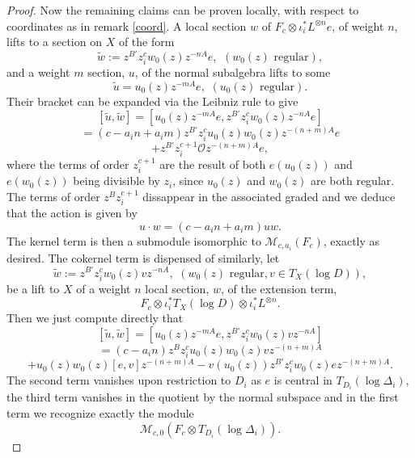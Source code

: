 \documentclass[10pt,a4paper]{amsart}
\newcommand{\OO}{\mathcal{O}}
\begin{document}
\begin{proof}
Now the remaining claims can be proven locally, with respect to coordinates as in remark \ref{coord}. A local section $w$ of $F_c\otimes\iota_i^*L^{\otimes n}e$, of weight $n$, lifts to a section on $X$ of the form $$\widetilde{w}:=z^{B'}z_i^{c}w_0(z) z^{-nA}e,\,\ (w_0(z)\,\,\mathrm{regular}),$$ and a weight $m$ section, $u$, of the normal subalgebra lifts to some $$\widetilde{u}=u_0(z) z^{-mA}e,\,\, (u_0(z)\,\,\mathrm{regular}).$$ Their bracket can be expanded via the Leibniz rule to give $$[\widetilde{u},\widetilde{w}]=[u_0(z)z^{-mA}e,z^{B'}z_i^cw_0(z)z^{-nA}e]$$ $$=(c-a_in+a_im)z^{B'}z_i^cu_0(z)w_0(z)z^{-(n+m)A}e$$ $$+z^{B'}z_i^{c+1}\OO z^{-(n+m)A}e,$$ where the terms of order $z_i^{c+1}$ are the result of both $e(u_0(z))$ and $e(w_0(z))$ being divisible by $z_i$, since $u_0(z)$ and $w_0(z)$ are both regular. The terms of order $z^Bz_i^{c+1}$ dissappear in the associated graded and we deduce that the action is given by $$u\cdot w=(c-a_in+a_im)uw.$$ The kernel term is then a submodule isomorphic to $\mathcal{M}_{c,a_i}(F_c)$, exactly as desired. The cokernel term is dispensed of similarly, let $$\widetilde{w}:=z^{B'}z_i^cw_0(z)vz^{-nA},\,\, (w_0(z)\,\,\mathrm{regular},v\in T_{X}(\log D)),$$ be a lift to $X$ of a weight $n$ local section, $w$, of the extension term,  $$F_c\otimes\iota_i^*T_X(\log D)\otimes\iota_i^*L^{\otimes n}.$$ Then we just compute directly that $$[\widetilde{u},\widetilde{w}]=[u_0(z)z^{-mA}e,z^{B'}z_i^cw_0(z)vz^{-nA}]$$ $$=(c-a_in)z^{B}z_i^cu_0(z)w_0(z)vz^{-(n+m)A}$$ $$+u_0(z)w_0(z)[e,v]z^{-(n+m)A}-v(u_0(z))z^{B'}z_i^cw_0(z)ez^{-(n+m)A}.$$ The second term vanishes upon restriction to $D_i$ as $e$ is central in $T_{D_i}(\log\Delta_i)$, the third term vanishes in the quotient by the normal subspace and in the first term we recognize exactly the module $$\mathcal{M}_{c,0}(F_c\otimes T_{D_i}(\log\Delta_i)).$$
\end{proof}
\end{document}
